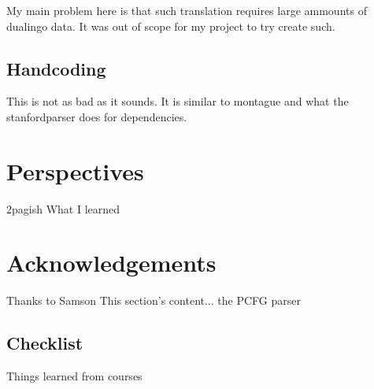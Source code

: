 \documentclass[12pt]{article}
\let\stdsection\section
\renewcommand\section{\newpage\stdsection}
\begin{document}
My main problem here is that such translation requires large ammounts of dualingo data. It was out of scope for my project to try create such.

\subsection{Handcoding}
This is not as bad as it sounds. It is similar to montague and what the stanfordparser does for dependencies.

\section{Perspectives}
2pagish
What I learned

\section*{Acknowledgements}
Thanks to Samson
This section's content...\cite{visser1999donkey}
the PCFG parser\cite{klein2003accurate}

\subsection{Checklist}
Things learned from courses




\end{document}

